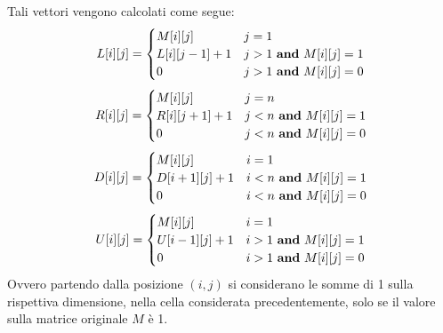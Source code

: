 \documentclass[../cheatSheetAlgoritmi.tex]{subfiles}
\begin{document}
Tali vettori vengono calcolati come segue: 
\begin{equation*}
  	L[i][j] =\begin{cases}
    	M[i][j] & \text{$j = 1$}\\
    	L[i][j-1] + 1 & \text{$j > 1$ \textbf{and} $M[i][j] = 1$}\\
    	0 & \text{$j > 1$ \textbf{and} $M[i][j] = 0$}
  	\end{cases}
\end{equation*}
\begin{equation*}
  	R[i][j] =\begin{cases}
    	M[i][j] & \text{$j = n$}\\
    	R[i][j+1] + 1 & \text{$j < n$ \textbf{and} $M[i][j] = 1$}\\
    	0 & \text{$j < n$ \textbf{and} $M[i][j] = 0$}
  	\end{cases}
\end{equation*}
\begin{equation*}
  	D[i][j] =\begin{cases}
    	M[i][j] & \text{$i = 1$}\\
    	D[i+1][j] + 1 & \text{$i < n$ \textbf{and} $M[i][j] = 1$}\\
    	0 & \text{$i < n$ \textbf{and} $M[i][j] = 0$}
  	\end{cases}
\end{equation*}
\begin{equation*}
  	U[i][j] =\begin{cases}
    	M[i][j] & \text{$i = 1$}\\
    	U[i-1][j] + 1 & \text{$i > 1$ \textbf{and} $M[i][j] = 1$}\\
    	0 & \text{$i > 1$ \textbf{and} $M[i][j] = 0$}
  	\end{cases}
\end{equation*}
Ovvero partendo dalla posizione $(i, j)$ si considerano le somme di 1 sulla rispettiva dimensione, nella cella considerata precedentemente, solo se il valore sulla matrice originale $M$ è 1. 
\end{document}
